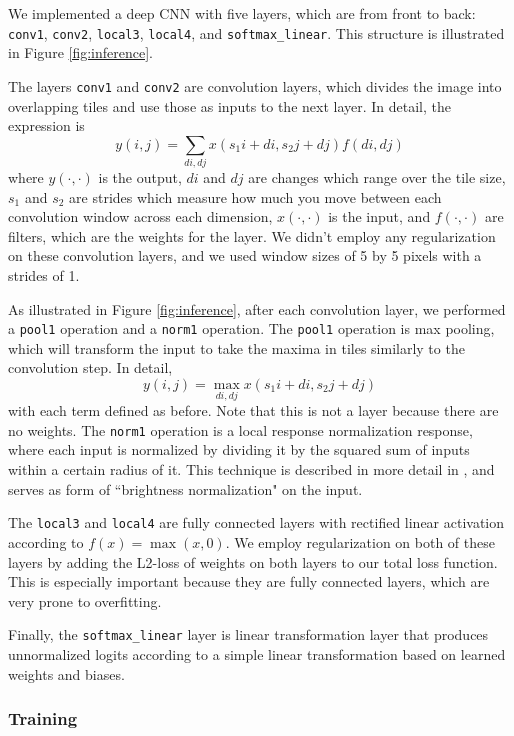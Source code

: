 \documentclass[11pt, twocolumn, twoside]{article}
\begin{document}
We implemented a deep CNN with five layers, which are from front to back: \texttt{conv1}, \texttt{conv2}, \texttt{local3}, \texttt{local4}, and \texttt{softmax\_linear}. This structure is illustrated in Figure \ref{fig:inference}. 

The layers \texttt{conv1} and \texttt{conv2} are convolution layers, which divides the image into overlapping tiles and use those as inputs to the next layer. In detail, the expression is
\[ y(i, j) = \sum_{di, dj} x(s_1i + di, s_2j + dj) f(di, dj)\]
where $y(\cdot, \cdot)$ is the output, $di$ and $dj$ are changes which range over the tile size, $s_1$ and $s_2$ are strides which measure how much you move between each convolution window across each dimension, $x(\cdot, \cdot)$ is the input, and $f(\cdot, \cdot)$ are filters, which are the weights for the layer. We didn't employ any regularization on these convolution layers, and we used window sizes of 5 by 5 pixels with a strides of 1.

As illustrated in Figure \ref{fig:inference}, after each convolution layer, we performed a \texttt{pool1} operation and a \texttt{norm1} operation. The \texttt{pool1} operation is max pooling, which will transform the input to take the maxima in tiles similarly to the convolution step. In detail,
\[ y(i, j) = \max_{di, dj} x(s_1i + di, s_2j + dj)\]
with each term defined as before. Note that this is not a layer because there are no weights. The \texttt{norm1} operation is a local response normalization response, where each input is normalized by dividing it by the squared sum of inputs within a certain radius of it. This technique is described in more detail in \cite{Krizhevsky}, and serves as form of ``brightness normalization" on the input.

The \texttt{local3} and \texttt{local4} are fully connected layers with rectified linear activation according to $f(x) = \max(x, 0)$. We employ regularization on both of these layers by adding the L2-loss of weights on both layers to our total loss function. This is especially important because they are fully connected layers, which are very prone to overfitting.

Finally, the \texttt{softmax\_linear} layer is linear transformation layer that produces unnormalized logits according to a simple linear transformation based on learned weights and biases.

\subsubsection{Training}
\end{document}
